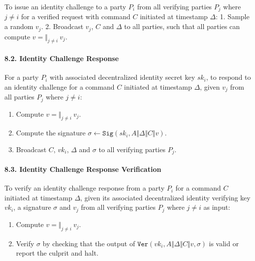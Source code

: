 \documentclass[
]{article}
\providecommand{\tightlist}{%
  \setlength{\itemsep}{0pt}\setlength{\parskip}{0pt}}
\begin{document}
To issue an identity challenge to a party \(P_i\) from all verifying
parties \(P_j\) where \(j \neq i\) for a verified request with command
\(C\) initiated at timestamp \(\Delta\): 1. Sample a random \(v_j\). 2.
Broadcast \(v_j\), \(C\) and \(\Delta\) to all parties, such that all
parties can compute \(v = \Vert _{j \neq i} \: v_j\).

\hypertarget{identity-challenge-response}{%
\paragraph{8.2. Identity Challenge
Response}\label{identity-challenge-response}}

For a party \(P_i\) with associated decentralized identity secret key
\(sk_i\), to respond to an identity challenge for a command \(C\)
initiated at timestamp \(\Delta\), given \(v_j\) from all parties
\(P_j\) where \(j \neq i\):

\begin{enumerate}
\def\labelenumi{\arabic{enumi}.}
\tightlist
\item
  Compute \(v = \Vert _{j \neq i} \: v_j\).
\item
  Compute the signature
  \(\sigma \leftarrow \mathtt{Sig}(sk_i, A \Vert \Delta \Vert C \Vert v)\).
\item
  Broadcast \(C\), \(vk_i\), \(\Delta\) and \(\sigma\) to all verifying
  parties \(P_j\).
\end{enumerate}

\hypertarget{identity-challenge-verification}{%
\paragraph{8.3. Identity Challenge Response
Verification}\label{identity-challenge-verification}}

To verify an identity challenge response from a party \(P_i\) for a
command \(C\) initiated at timestamp \(\Delta\), given its associated
decentralized identity verifying key \(vk_i\), a signature \(\sigma\)
and \(v_j\) from all verifying parties \(P_j\) where \(j \neq i\) as
input:

\begin{enumerate}
\def\labelenumi{\arabic{enumi}.}
\tightlist
\item
  Compute \(v = \Vert _{j \neq i} \: v_j\).
\item
  Verify \(\sigma\) by checking that the output of
  \(\mathtt{Ver}(vk_i, A \Vert \Delta \Vert C \Vert v, \sigma)\) is
  valid or report the culprit and halt.
\end{enumerate}
\end{document}

